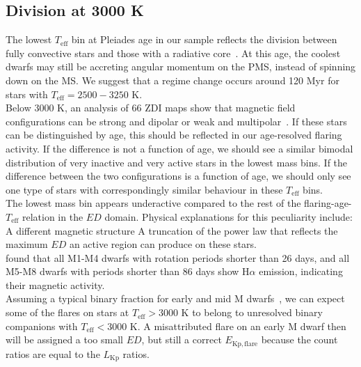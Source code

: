 \documentclass{aa}
\begin{document}
\subsection{Division at 3000 K}
The lowest $T_\mathrm{eff}$ bin at Pleiades age in our sample reflects the division between fully convective stars and those with a radiative core~\citep{reid_new_2005}. At this age, the coolest dwarfs may still be accreting angular momentum on the PMS, instead of spinning down on the MS. We suggest that a regime change occurs around 120 Myr for stars with $T_\mathrm{eff}=2500-3250$ K.
\\
Below 3000 K, an analysis of 66 ZDI maps show that magnetic field configurations can be strong and dipolar or weak and multipolar~\citep{morin_m4magneticfields_2008, see_zdispindown_2017}. If these stars can be distinguished by age, this should be reflected in our age-resolved flaring activity. If the difference is not a function of age, we should see a similar bimodal distribution of very inactive and very active stars in the lowest mass bins. If the difference between the two configurations is a function of age, we should only see one type of stars with correspondingly similar behaviour in these $T_\mathrm{eff}$ bins.
\\
The lowest mass bin appears underactive compared to the rest of the flaring-age-$T_\mathrm{eff}$ relation in the $ED$ domain. Physical explanations for this peculiarity include:
A different magnetic structure
A truncation of the power law that reflects the maximum $ED$ an active region can produce on these stars.
\\
\citet{west_magneticrotationage_2015} found that all M1-M4 dwarfs with rotation periods shorter than 26 days, and all M5-M8 dwarfs with periods shorter than 86 days show H$\alpha$ emission, indicating their magnetic activity.
\\
Assuming a typical binary fraction for early and mid M dwarfs~\citep{fischer_multiplicity_1992}, we can expect some of the flares on stars at $T_\mathrm{eff}>3000$ K to belong to unresolved binary companions with $T_\mathrm{eff}<3000$ K. A misattributed flare on an early M dwarf then will be assigned a too small $ED$, but still a correct $E_\mathrm{Kp, flare}$ because the count ratios are equal to the $L_\mathrm{Kp}$ ratios.
\end{document}
